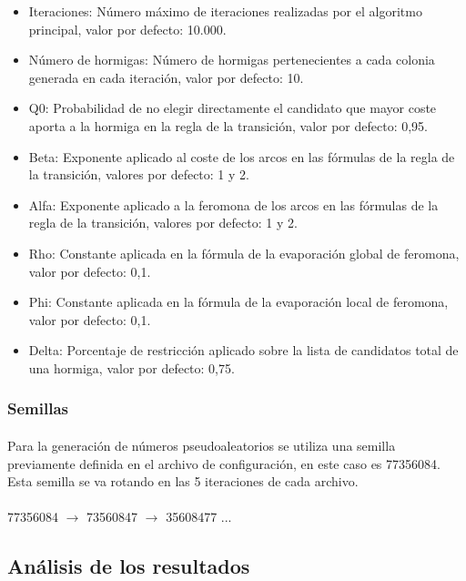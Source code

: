 		\begin{itemize}
			
			\item Iteraciones:  Número máximo de iteraciones realizadas por el algoritmo principal, valor por defecto: 10.000.
			\item Número de hormigas: Número de hormigas pertenecientes a cada colonia generada en cada iteración, valor por defecto: 10.
			\item Q0: Probabilidad de no elegir directamente el candidato que mayor coste aporta a la hormiga en la regla de la transición, valor por defecto: 0,95.
			\item Beta: Exponente aplicado al coste de los arcos en las fórmulas de la regla de la transición, valores por defecto: 1 y 2.
			\item Alfa: Exponente aplicado a la feromona de los arcos en las fórmulas de la regla de la transición, valores por defecto: 1 y 2.
			\item Rho: Constante aplicada en la fórmula de la evaporación global de feromona, valor por defecto: 0,1.
			\item Phi: Constante aplicada en la fórmula de la evaporación local de feromona, valor por defecto: 0,1.
			\item Delta: Porcentaje de restricción aplicado sobre la lista de candidatos total de una hormiga, valor por defecto: 0,75.
			
		\end{itemize}
	\subsubsection{Semillas}
	
	\paragraph{}Para la generación de números pseudoaleatorios se utiliza una semilla previamente definida en el archivo de configuración, en este caso es 77356084. Esta semilla se va rotando en las 5 iteraciones de cada archivo.
	
	
	\paragraph{} 77356084 $\rightarrow$ 73560847 $\rightarrow$ 35608477  ...
	
	
	\subsection{Análisis de los resultados}
	
